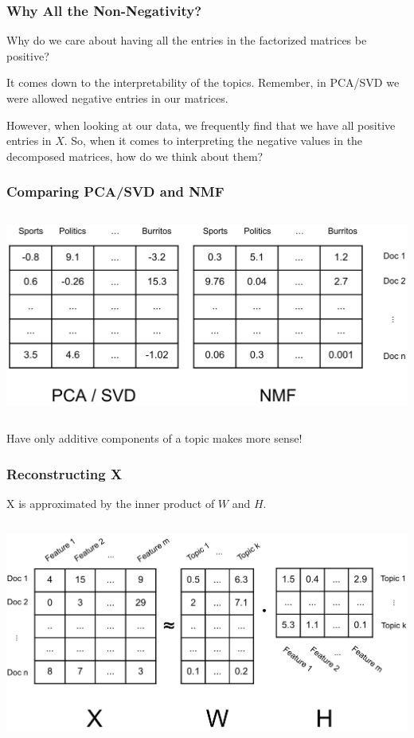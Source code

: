 \documentclass{beamer}
\begin{document}
\begin{frame}
  \frametitle{Why All the Non-Negativity?}
  Why do we care about having all the entries in the factorized matrices be positive? \vspace{5mm} \pause

  It comes down to the interpretability of the topics. Remember, in PCA/SVD we were allowed negative entries in our matrices. \vspace{5mm} \pause

  However, when looking at our data, we frequently find that we have all positive entries in $X$. So, when it comes to interpreting the negative values in the decomposed matrices, how do we think about them?
\end{frame}

\begin{frame}
  \frametitle{Comparing PCA/SVD and NMF}
  \begin{columns}
    \includegraphics[width=\textwidth]{images/pca_nmf.png}
  \end{columns} \vspace{4mm}

  Have only additive components of a topic makes more sense!
\end{frame}

\begin{frame}
  \frametitle{Reconstructing X}
  X is approximated by the inner product of $W$ and $H$. \vspace{4mm}
  \begin{columns}
    \includegraphics[width=\textwidth]{images/x_w_h.png}
  \end{columns} \vspace{4mm}
\end{frame}
\end{document}
